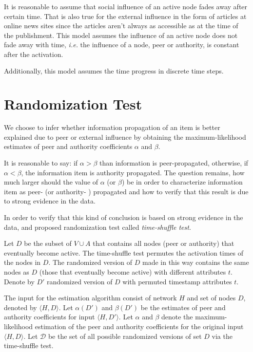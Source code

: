 \documentclass[times, utf8, zavrsni]{fer}
\begin{document}
It is reasonable to assume that social influence of an active  node fades away after certain time. That is also true for the external influence in the form of articles at online news sites since the articles aren't always as  accessible as at the time of the publishment. This model assumes the influence of an active node does not fade away with time, \emph{i.e.} the influence of a node, peer or authority, is constant after the activation.

Additionally, this model assumes the time progress in discrete time steps.


\section{Randomization Test}

We choose to infer whether information propagation of an item is better explained due to peer or external influence by obtaining the maximum-likelihood estimates of peer and authority coefficients $\alpha$ and $\beta$. 

It is reasonable to say: if $\alpha > \beta$ than information is peer-propagated, otherwise, if $\alpha <  \beta$, the information item is authority propagated. The question remains, how much larger should the value of $\alpha$ (or $\beta$) be in order to characterize information item as peer- (or authority- ) propagated and how to verify that this result is due to strong evidence in the data.

In order to verify that this kind of conclusion is based on strong evidence in the data, \cite{akm-icsn-kdd08} and \cite{authority} proposed randomization test called \emph{time-shuffle test}.

Let $D$ be the subset of $V \cup A$ that contains all nodes (peer or authority) that eventually become active. The time-shuffle test permutes the activation times of the nodes in $D$. The randomized version of $D$ made in this way contains the same nodes as $D$ (those that eventually become active) with different attributes $t$. Denote by $D'$ randomized version of $D$ with permuted timestamp attributes $t$. 

The input for the estimation algorithm consist of network $H$ and set of nodes $D$, denoted by $\langle H, D\rangle$. Let $\alpha(D')$ and $\beta(D')$ be the estimates of peer and authority coefficients for input $\langle H, D'\rangle$. Let $\alpha$ and $\beta$ denote the maximum-likelihood estimation of the peer and authority coefficients for the original input $\langle H, D\rangle$. Let $\mathcal{D}$ be the set of all possible randomized versions of set $D$ via the time-shuffle test. 
\end{document}
